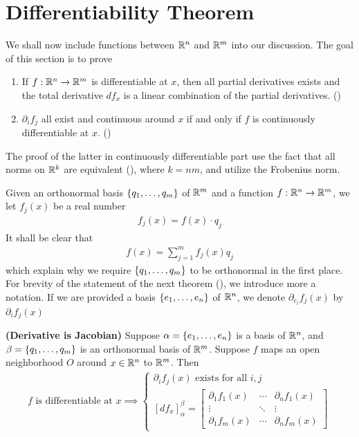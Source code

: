\documentclass{report}
\begin{document}
\section{Differentiability Theorem}
\begin{mdframed}
We shall now include functions between $\mathbb{R}^n$ and  $\mathbb{R}^m$ into our discussion. The goal of this section is to prove 
\begin{enumerate}[label=(\alph*)]
  \item If $f:\mathbb{R}^n\rightarrow \mathbb{R}^m$ is differentiable at $x$, then all partial derivatives exists and the total derivative  $df_x$ is a linear combination of the partial derivatives. ()
  \item $\partial_i f_j$ all exist and continuous around $x$  if and only if $f$ is continuously differentiable at $x$. ()
\end{enumerate}
The proof of the latter in continuously differentiable part use the fact that all norms on $\mathbb{R}^{k}$ are equivalent (), where $k=nm$, and utilize the Frobenius norm. 
\end{mdframed}
\begin{mdframed}

Given an orthonormal basis  $\{ q_1,\dots ,q_m \}$ of $\mathbb{R}^m$ and a function $f:\mathbb{R}^n \rightarrow \mathbb{R}^m$, we let $f_j(x)$ be a real number
\begin{align*}
f_j(x)=f(x)\cdot q_j
\end{align*}
It shall be clear that 
\begin{align*}
f(x)=\sum_{j=1}^m f_j(x)q_j
\end{align*}
which explain why we require $\{ q_1,\dots ,q_m \}$ to be orthonormal in the first place.\\

For brevity of the statement of the next theorem (), we introduce more a notation. If we are provided a basis $\{ e_1,\dots ,e_n \}$ of $\mathbb{R}^n$, we denote $\partial_{e_i} f_j(x)$ by $\partial_i f_j(x)$
\end{mdframed}
\begin{theorem}
\label{DiJ}
\textbf{(Derivative is Jacobian)} Suppose  $\alpha =\{ e_1,\dots ,e_n \}$ is a basis of $\mathbb{R}^n$, and $\beta =\{ q_1,\dots ,q_m \}$ is an orthonormal basis of  $\mathbb{R}^m$. Suppose  $f$ maps an open neighborhood $O$ around $x\in\mathbb{R}^n$ to $\mathbb{R}^m$.  Then 
\begin{align*}
  f\text{ is differentiable at }x\implies \begin{cases}
    \partial_{i}f_j(x)\text{ exists for all }i,j\\
    [df_x]_{\alpha }^{\beta }=\begin{bmatrix}
      \partial_1f_1(x)&\cdots & \partial_nf_1(x)\\
      \vdots & \ddots & \vdots\\
      \partial_1f_m(x) & \cdots & \partial_nf_m(x)
    \end{bmatrix}
  \end{cases}
\end{align*}
\end{theorem}
\end{document}
